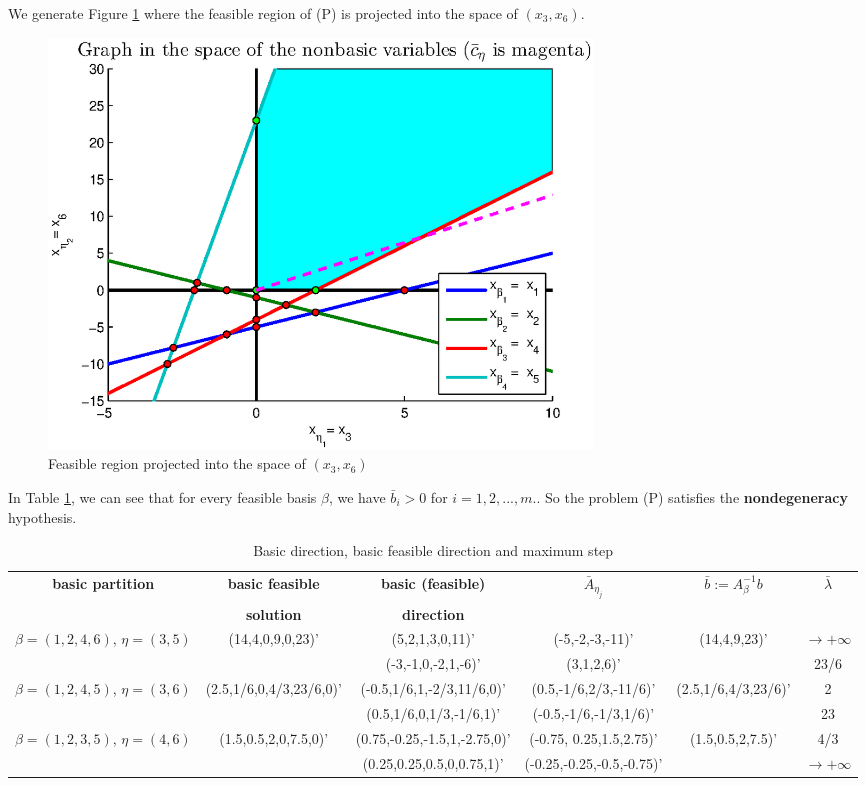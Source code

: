 We generate Figure \ref{fig:p1} where the feasible region of (P) is projected into the space of  $(x_3,x_6)$.


\begin{figure}[h!!]
\includegraphics[width=0.7\textwidth]{p1/p1.eps}
\caption{Feasible region projected into the space of $(x_3,x_6)$}\label{fig:p1}
\end{figure}

In Table \ref{tab:max-step}, we can see that for every feasible basis $\beta$, we have $\bar{b}_i > 0$ for $i=1,2,...,m.$. So the problem (P) satisfies the \textbf{nondegeneracy} hypothesis.

\begin{table}[!h]
\centering
\footnotesize
\begin{tabular}{|c|c|c|c|c|c|}\hline

\textbf{basic partition} & \textbf{basic feasible} & \textbf{basic (feasible)} & $\bar{A}_{\eta_j}$ & $ \bar{b} := A_{\beta}^{-1}b$ & $\bar{\lambda}$ \\
&\textbf{solution} & \textbf{direction} & & & \\
\hline
$\beta = (1,2,4,6) $, $\eta = (3,5)$&(14,4,0,9,0,23)'&(5,2,1,3,0,11)'& (-5,-2,-3,-11)' &(14,4,9,23)'&$\to+\infty$\\
&&(-3,-1,0,-2,1,-6)'& (3,1,2,6)'&&23/6\\\hline
$\beta = (1,2,4,5) $, $\eta = (3,6)$&(2.5,1/6,0,4/3,23/6,0)'&(-0.5,1/6,1,-2/3,11/6,0)'& (0.5,-1/6,2/3,-11/6)' &(2.5,1/6,4/3,23/6)'&2\\
&&(0.5,1/6,0,1/3,-1/6,1)'& (-0.5,-1/6,-1/3,1/6)' &&23\\\hline
$\beta = (1,2,3,5) $, $\eta = (4,6)$&(1.5,0.5,2,0,7.5,0)'&(0.75,-0.25,-1.5,1,-2.75,0)'& (-0.75, 0.25,1.5,2.75)' &(1.5,0.5,2,7.5)'&4/3\\
&&(0.25,0.25,0.5,0,0.75,1)'& (-0.25,-0.25,-0.5,-0.75)' &&$\to+\infty$\\\hline
\end{tabular}
\caption{Basic direction, basic feasible direction and maximum step}
\label{tab:max-step}
\end{table}

